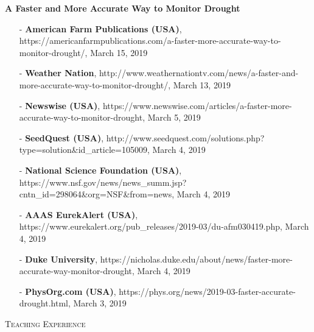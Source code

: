 \documentclass[10pt]{article}
\newenvironment{changemargin}[2]{%
  \begin{list}{}{%
 \setlength{\topsep}{0pt}%
 \setlength{\leftmargin}{#1}%
 \setlength{\rightmargin}{#2}%
 \setlength{\listparindent}{\parindent}%
 \setlength{\itemindent}{\parindent}%
 \setlength{\parsep}{\parskip}%
  }%
  \item[]}{\end{list}
}
\newcommand{\lineover}{
  \begin{changemargin}{-0.05in}{-0.05in}
  \vspace*{-8pt}
  \hrulefill \\
  \vspace*{-2pt}
  \end{changemargin}
}
\newcommand{\header}[1]{
  \begin{changemargin}{-0.5in}{-0.5in}
  \scshape{#1}\\
  \lineover
  \end{changemargin}
}
\newenvironment{body} {
  \vspace*{-2pt}
  \begin{changemargin}{-0.5in}{-0.5in}
}
{\end{changemargin}
}
\begin{document}
\begin{body}
  \textbf {A Faster and More Accurate Way to Monitor Drought}\\
  \vspace*{-4pt}
  \begin{itemize} \itemsep -0pt
    \item[-]  \textbf{American Farm Publications (USA)}, https://americanfarmpublications.com/a-faster-more-accurate-way-to-monitor-drought/, \hfill{March 15, 2019}\\
    \item[-]  \textbf{Weather Nation}, http://www.weathernationtv.com/news/a-faster-and-more-accurate-way-to-monitor-drought/, \hfill{March 13, 2019}\\
    \item[-]  \textbf{Newswise (USA)}, https://www.newswise.com/articles/a-faster-more-accurate-way-to-monitor-drought, \hfill{March 5, 2019}\\
    \item[-]  \textbf{SeedQuest (USA)}, http://www.seedquest.com/solutions.php?type=solution\&id\_article=105009, \hfill{March 4, 2019}\\
    \item[-]  \textbf{National Science Foundation (USA)}, https://www.nsf.gov/news/news\_summ.jsp?cntn\_id=298064\&org=NSF\&from=news, \hfill{March 4, 2019}\\
    \item[-]  \textbf{AAAS EurekAlert (USA)}, https://www.eurekalert.org/pub\_releases/2019-03/du-afm030419.php, \hfill{March 4, 2019}\\
    \item[-]  \textbf{Duke University}, https://nicholas.duke.edu/about/news/faster-more-accurate-way-monitor-drought, \hfill{March 4, 2019}\\
    \item[-]  \textbf{PhysOrg.com (USA)}, https://phys.org/news/2019-03-faster-accurate-drought.html, \hfill{March 3, 2019}\\
  \end{itemize} 

\end{body}

\medskip


\header{Teaching Experience}
\end{document}
